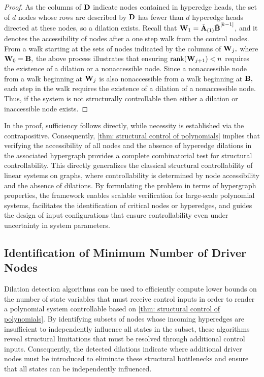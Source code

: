 \documentclass[journal,twoside,web]{ieeecolor}
\newcommand{\rank}{\text{rank}}
\newcommand{\Bv}{\mathbf{B}}
\begin{document}
\begin{proof}
        
        As the columns of $\textbf D$ indicate nodes contained in hyperedge heads, the set of $d$ nodes whose rows are described by $\textbf D$ has fewer than $d$ hyperedge heads directed at these nodes, so a dilation exists. Recall that $\textbf W_1=\tilde{\textbf A}_{(1)}\tilde{\textbf B}^{[k-1]}$, and it denotes the accessibility of nodes after a one step walk from the control nodes.
    From a walk starting at the sets of nodes indicated by the columns of $\textbf W_j,$ where $\textbf W_0=\Bv,$ the above process illustrates that ensuring $\rank(\textbf W_{j+1})<n$ requires the existence of a dilation or a nonaccessible node.
    Since a nonaccessible node from a walk beginning at $\textbf W_j$ is also nonaccessible from a walk beginning at $\textbf B,$ each step in the walk requires the existence of a dilation of a nonaccessible node.
    Thus, if the system is not structurally controllable then either a dilation or inaccessible node exists.
\end{proof}

In the proof, sufficiency follows directly, while necessity is established via the contrapositive. Consequently, \cref{thm: structural control of polynomials} implies that verifying the accessibility of all nodes and the absence of hyperedge dilations in the associated hypergraph provides a complete combinatorial test for structural controllability. This directly generalizes the classical structural controllability of linear systems on graphs, where controllability is determined by node accessibility and the absence of dilations. By formulating the problem in terms of hypergraph properties, the framework enables scalable verification for large-scale polynomial systems, facilitates the identification of critical nodes or hyperedges, and guides the design of input configurations that ensure controllability even under uncertainty in system parameters.



\subsection{Identification of Minimum Number of Driver Nodes}\label{sec: 3d}


Dilation detection algorithms can be used to efficiently compute lower bounds on the number of state variables that must receive control inputs in order to render a polynomial system controllable based on \cref{thm: structural control of polynomials}. By identifying subsets of nodes whose incoming hyperedges are insufficient to independently influence all states in the subset, these algorithms reveal structural limitations that must be resolved through additional control inputs. Consequently, the detected dilations indicate where additional driver nodes must be introduced to eliminate these structural bottlenecks and ensure that all states can be independently influenced.
\end{document}
